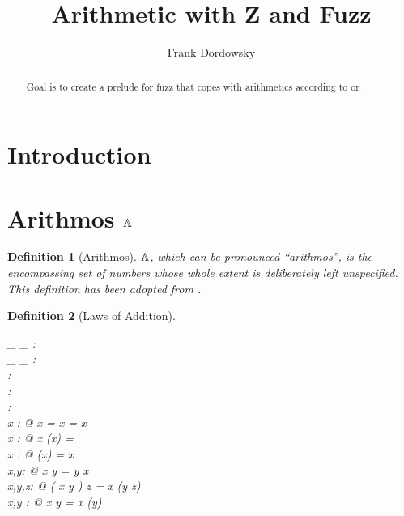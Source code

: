 \documentclass[12pt]{scrartcl}
\newtheorem{zdef}{Definition}[section]
\begin{document}
\title{Arithmetic with Z and Fuzz}

\author{Frank Dordowsky}

\maketitle

\begin{abstract}
Goal is to create a prelude for fuzz that copes with arithmetics
according to \cite{Valentine2012} or \cite{Arthan1996}.
\end{abstract}

\tableofcontents

\section{Introduction}
\label{sec:intro}

\section{Arithmos $\mathbb{A}$}
\label{sec:arithmos}

\begin{zdef}[Arithmos]
  \label{zdef:arithmos}
  $\mathbb{A}$, which can be pronounced “arithmos”, is the encompassing
  set of numbers whose whole extent is deliberately left
  unspecified. This definition has been adopted from
  \cite{Valentine2012}. 
  \begin{zed}
    [\Arithmos] 
  \end{zed}
\end{zdef}

\begin{zdef}[Laws of Addition]
  \label{zdef:laws-addition}
  \begin{axdef}
    \_ \aplus \_ : \Arithmos \cross \Arithmos \fun \Arithmos\\
    \_ \aminus \_ : \Arithmos \cross \Arithmos \fun \Arithmos\\
    \aneg : \Arithmos \fun \Arithmos\\
    \azero : \Arithmos\\
    \aone : \Arithmos\\
    \where
    \forall x : \Arithmos @ x \aplus \azero = \azero \aplus x = x \\
    \forall x : \Arithmos @ x \aplus (\aneg x) = \azero \\
    \forall x : \Arithmos @ \aneg (\aneg x) = x \\
    \forall x,y: \Arithmos @ x \aplus y = y \aplus x \\
    \forall x,y,z: \Arithmos @ ( x \aplus y ) \aplus z = x \aplus (y
    \aplus z) \\
    \forall x,y : \Arithmos @ x \aminus y = x \aplus (\aneg y)\\
  \end{axdef}
\end{zdef}
\end{document}
